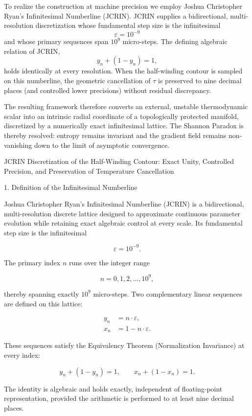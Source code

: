 To realize the construction at machine precision we employ Joshua Christopher Ryan’s Infinitesimal Numberline (JCRIN). JCRIN supplies a bidirectional, multi-resolution discretization whose fundamental step size is the infinitesimal
\[
\varepsilon=10^{-9}
\]
and whose primary sequences span \(10^9\) micro-steps. The defining algebraic relation of JCRIN,
\[
y_n+(1-y_n)=1,
\]
holds identically at every resolution. When the half-winding contour is sampled on this numberline, the geometric cancellation of \(\tau\) is preserved to nine decimal places (and controlled lower precisions) without residual discrepancy.

The resulting framework therefore converts an external, unstable thermodynamic scalar into an intrinsic radial coordinate of a topologically protected manifold, discretized by a numerically exact infinitesimal lattice. The Shannon Paradox is thereby resolved: entropy remains invariant and the gradient field remains non-vanishing down to the limit of asymptotic convergence.
 
JCRIN Discretization of the Half-Winding Contour: Exact Unity, Controlled Precision, and Preservation of Temperature Cancellation

1. Definition of the Infinitesimal Numberline

Joshua Christopher Ryan’s Infinitesimal Numberline (JCRIN) is a bidirectional, multi-resolution discrete lattice designed to approximate continuous parameter evolution while retaining exact algebraic control at every scale. Its fundamental step size is the infinitesimal

\[
\varepsilon = 10^{-9}.
\]

The primary index \(n\) runs over the integer range

\[
n = 0,1,2,\dots,10^9,
\]

thereby spanning exactly \(10^9\) micro-steps. Two complementary linear sequences are defined on this lattice:

\[
\begin{aligned}
y_n &= n\cdot\varepsilon,\\
x_n &= 1 - n\cdot\varepsilon.
\end{aligned}
\]

These sequences satisfy the Equivalency Theorem (Normalization Invariance) at every index:

\[
y_n + (1 - y_n) = 1, \qquad x_n + (1 - x_n) = 1.
\]

The identity is algebraic and holds exactly, independent of floating-point representation, provided the arithmetic is performed to at least nine decimal places.

